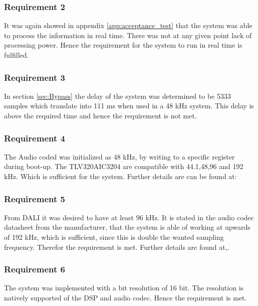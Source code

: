 \subsubsection*{Requirement 2}

It was again showed in appendix \ref{app:acceptance_test} that the system was able to process the information in real time. There was not at any given point lack of processing power. Hence the requirement for the system to run in real time is fulfilled.


\subsubsection*{Requirement 3}

In section \ref{sec:Bypass} the delay of the system was determined to be 5333 samples which translate into 111 ms when used in a 48 kHz system. This delay is above the required time and hence the requirement is not met.

\subsubsection*{Requirement 4}

The Audio coded was initialized as 48 kHz, by writing to a specific register during boot-up. The TLV320AIC3204 are compatible with 44.1,48,96 and 192 kHz. Which is sufficient for the system. Further details are can be found at:


\subsubsection*{Requirement 5}
From DALI it was desired to have at least 96 kHz. It is stated in the audio codec datasheet from the manufacturer, that the system is able of working at upwards of 192 kHz, which is sufficient, since this is double the wanted sampling frequency. Therefor the requirement is met. Further details are found at,.


\subsubsection*{Requirement 6}
The system was implemented with a bit resolution of 16 bit. The resolution is natively supported of the DSP and audio codec. Hence the requirement is met.

\vspace*{-5mm}
